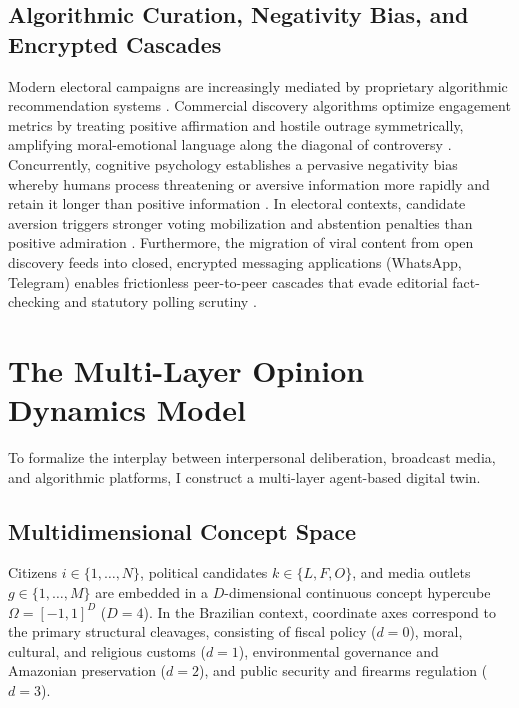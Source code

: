 \documentclass[a4paper,fleqn]{cas-dc}
\begin{document}
\subsection{Algorithmic Curation, Negativity Bias, and Encrypted Cascades}
Modern electoral campaigns are increasingly mediated by proprietary algorithmic recommendation systems \citep{cinelli2021echo, tucker2018social}. Commercial discovery algorithms optimize engagement metrics by treating positive affirmation and hostile outrage symmetrically, amplifying moral-emotional language along the diagonal of controversy \citep{brady2017emotion, crockett2017moral, bail2018exposure}. Concurrently, cognitive psychology establishes a pervasive negativity bias whereby humans process threatening or aversive information more rapidly and retain it longer than positive information \citep{rozin2001negativity, baumeister2001bad}. In electoral contexts, candidate aversion triggers stronger voting mobilization and abstention penalties than positive admiration \citep{almeida2019evangelicals, nicolau2020brasil}. Furthermore, the migration of viral content from open discovery feeds into closed, encrypted messaging applications (WhatsApp, Telegram) enables frictionless peer-to-peer cascades that evade editorial fact-checking and statutory polling scrutiny \citep{resende2019whatsapp, garimella2020images, cesarino2020posverdade}.

\section{The Multi-Layer Opinion Dynamics Model}
\label{sec:model}

To formalize the interplay between interpersonal deliberation, broadcast media, and algorithmic platforms, I construct a multi-layer agent-based digital twin.

\subsection{Multidimensional Concept Space}
\label{subsec:concept_space}
Citizens $i \in \{1, \dots, N\}$, political candidates $k \in \{L, F, O\}$, and media outlets $g \in \{1, \dots, M\}$ are embedded in a $D$-dimensional continuous concept hypercube $\Omega = [-1, 1]^D$ ($D = 4$). In the Brazilian context, coordinate axes correspond to the primary structural cleavages, consisting of fiscal policy ($d=0$), moral, cultural, and religious customs ($d=1$), environmental governance and Amazonian preservation ($d=2$), and public security and firearms regulation ($d=3$).
\end{document}
